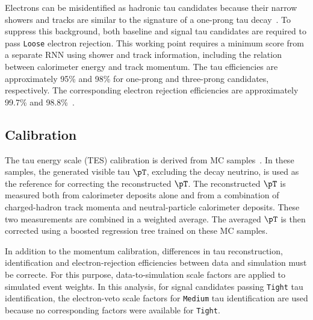 Electrons can be misidentified as hadronic tau candidates because their narrow showers and tracks are similar to the signature of a one-prong tau decay~\cite{ATLAS2022TauR22}.
To suppress this background, both baseline and signal tau candidates are required to pass \texttt{Loose} electron rejection.
This working point requires a minimum score from a separate RNN using shower and track information, including the relation between calorimeter energy and track momentum.
The tau efficiencies are approximately 95\% and 98\% for one-prong and three-prong candidates, respectively.
The corresponding electron rejection efficiencies are approximately 99.7\% and 98.8\%~\cite{ATLAS2022TauR22}.

\subsection{Calibration}

The tau energy scale (TES) calibration is derived from MC samples~\cite{ATLAS2022TauR22}.
In these samples, the generated visible tau $\pT$, excluding the decay neutrino, is used as the reference for correcting the reconstructed $\pT$.
The reconstructed $\pT$ is measured both from calorimeter deposits alone and from a combination of charged-hadron track momenta and neutral-particle calorimeter deposits.
These two measurements are combined in a weighted average.
The averaged $\pT$ is then corrected using a boosted regression tree trained on these MC samples.

In addition to the momentum calibration, differences in tau reconstruction, identification and electron-rejection efficiencies between data and simulation must be correcte.
For this purpose, data-to-simulation scale factors are applied to simulated event weights.
In this analysis, for signal candidates passing \texttt{Tight} tau identification, the electron-veto scale factors for \texttt{Medium} tau identification are used because no corresponding factors were available for \texttt{Tight}.

